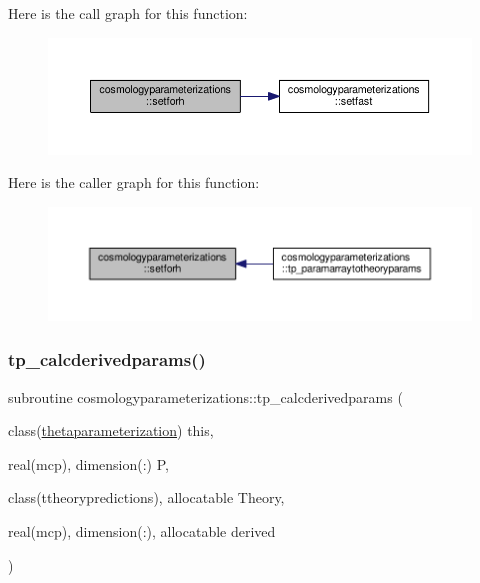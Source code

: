 Here is the call graph for this function\+:
\nopagebreak
\begin{figure}[H]
\begin{center}
\leavevmode
\includegraphics[width=350pt]{namespacecosmologyparameterizations_a4269c5d3027267744bdf4404d32a9db0_cgraph}
\end{center}
\end{figure}
Here is the caller graph for this function\+:
\nopagebreak
\begin{figure}[H]
\begin{center}
\leavevmode
\includegraphics[width=350pt]{namespacecosmologyparameterizations_a4269c5d3027267744bdf4404d32a9db0_icgraph}
\end{center}
\end{figure}
\mbox{\label{namespacecosmologyparameterizations_aeedc92b3479b3427db06f0770e7c13c0}} 
\subsubsection{\texorpdfstring{tp\+\_\+calcderivedparams()}{tp\_calcderivedparams()}}
{\footnotesize\ttfamily subroutine cosmologyparameterizations\+::tp\+\_\+calcderivedparams (\begin{DoxyParamCaption}\item[{class(\mbox{\hyperlink{structcosmologyparameterizations_1_1thetaparameterization}{thetaparameterization}})}]{this,  }\item[{real(mcp), dimension(\+:)}]{P,  }\item[{class(ttheorypredictions), allocatable}]{Theory,  }\item[{real(mcp), dimension(\+:), allocatable}]{derived }\end{DoxyParamCaption})\hspace{0.3cm}{\ttfamily [private]}}



